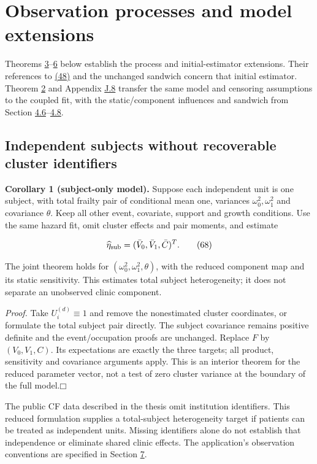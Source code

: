 \documentclass[11pt]{article}
\providecommand{\square}{\mdlgwhtsquare}
\begin{document}
\section{Observation processes and model extensions}\label{sec:5}

Theorems \hyperref[res:Theorem-3]{3}--\hyperref[res:Theorem-6]{6} below establish the process and initial-estimator extensions. Their references to \hyperref[eq:48]{(48)} and the unchanged sandwich concern that initial estimator. Theorem \hyperref[res:Theorem-2]{2} and Appendix \hyperref[sec:J.8]{J.8} transfer the same model and censoring assumptions to the coupled fit, with the static/component influences and sandwich from Section \hyperref[sec:4.6]{4.6}--\hyperref[sec:4.8]{4.8}.

\subsection{Independent subjects without recoverable cluster identifiers}\label{sec:5.1}

\label{res:Corollary-1}
\textbf{Corollary 1 (subject-only model).} Suppose each independent unit is one subject, with total frailty pair of conditional mean one, variances \(\omega_0^2,\omega_1^2\) and covariance \(\theta\). Keep all other event, covariate, support and growth conditions. Use the same hazard fit, omit cluster effects and pair moments, and estimate

\begin{equation*}
\widehat\eta_{\rm sub}=(\bar V_0,\bar V_1,\bar C)^T.
\tag{68}\label{eq:68}
\end{equation*}

The joint theorem holds for \((\omega_0^2,\omega_1^2,\theta)\), with the reduced component map and its static sensitivity. This estimates total subject heterogeneity; it does not separate an unobserved clinic component.

\textit{Proof.} Take \(U_i^{(d)}\equiv1\) and remove the nonestimated cluster coordinates, or formulate the total subject pair directly. The subject covariance remains positive definite and the event/occupation proofs are unchanged. Replace \(F\) by \((V_0,V_1,C)\). Its expectations are exactly the three targets; all product, sensitivity and covariance arguments apply. This is an interior theorem for the reduced parameter vector, not a test of zero cluster variance at the boundary of the full model.\hfill$\square$

The public CF data described in the thesis omit institution identifiers. This reduced formulation supplies a total-subject heterogeneity target if patients can be treated as independent units. Missing identifiers alone do not establish that independence or eliminate shared clinic effects. The application's observation conventions are specified in Section \hyperref[sec:7]{7}.
\end{document}
